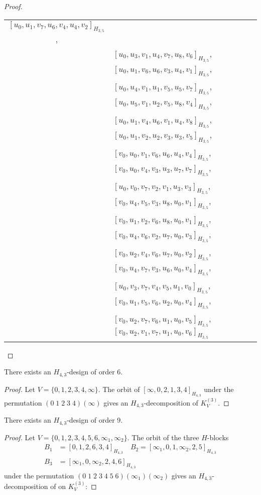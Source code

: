 \begin{subappendices}
\begin{proof}
{\begin{longtable}{|c|l|}
  $[u_0, u_1, v_7, u_6, v_4, u_4, v_2]_{H_{3,5}}$, \\* &
  $[u_0, u_3, v_1, u_4, v_7, u_8, v_6]_{H_{3,5}}$,
  $[u_0, u_1, v_6, u_6, v_3, u_4, v_1]_{H_{3,5}}$, \\* &
  $[u_0, u_4, v_1, u_1, v_5, u_5, v_7]_{H_{3,5}}$,
  $[u_0, u_5, v_1, u_2, v_5, u_8, v_4]_{H_{3,5}}$, \\* &
  $[u_0, u_1, v_4, u_6, v_1, u_4, v_8]_{H_{3,5}}$,
  $[u_0, u_1, v_2, u_2, v_3, u_3, v_5]_{H_{3,5}}$, \\* &
  $[v_0, u_0, v_1, v_6, u_6, u_4, v_4]_{H_{3,5}}$,
  $[v_0, u_0, v_4, v_3, u_3, u_7, v_7]_{H_{3,5}}$, \\* &
  $[u_0, v_0, v_7, v_2, v_1, u_3, v_3]_{H_{3,5}}$,
  $[v_0, u_4, v_5, v_3, u_8, u_0, v_1]_{H_{3,5}}$, \\* &
  $[v_0, u_1, v_2, v_6, u_8, u_0, v_1]_{H_{3,5}}$,
  $[v_0, u_4, v_6, v_2, u_7, u_0, v_3]_{H_{3,5}}$, \\* &
  $[v_0, u_2, v_4, v_6, u_7, u_0, v_2]_{H_{3,5}}$,
  $[v_0, u_4, v_7, v_3, u_6, u_0, v_4]_{H_{3,5}}$, \\* &
  $[u_0, v_3, v_7, v_4, v_5, u_1, v_0]_{H_{3,5}}$,
  $[v_0, u_1, v_5, v_6, u_2, u_0, v_4]_{H_{3,5}}$, \\* &
  $[v_0, u_2, v_7, v_6, u_1, u_0, v_5]_{H_{3,5}}$,
  $[v_0, u_2, v_1, v_7, u_1, u_0, v_6]_{H_{3,5}}$
\\ \hline
\end{longtable}
}
\end{proof}


\begin{example} \label{eg:H_43-6}
There exists an $H_{4,3}$-design of order 6.
\end{example}

\begin{proof}
Let $V = \{0,1,2,3,4,\infty\}$. The orbit of $[\infty, 0, 2, 1, 3, 4]_{H_{4,3}}$ under the permutation $(0\; 1\; 2\; 3\; 4)(\infty)$ gives an $H_{4,3}$-decomposition of $K_V^{(3)}$.
\end{proof}


\begin{example} \label{eg:H_43-9}
There exists an $H_{4,3}$-design of order 9.
\end{example}

\begin{proof}
Let $V = \{0,1,2,3,4,5,6,\infty_1,\infty_2\}$. The orbit of the three $H$-blocks
\begin{align*}
    B_1 &= [0,1,2,6,3,4]_{H_{4,3}} \quad
    B_2 = [\infty_1, 0, 1, \infty_2, 2, 5]_{H_{4,3}} \\
    B_3 &= [\infty_1, 0, \infty_2, 2, 4, 6]_{H_{4,3}}
\end{align*}
under the permutation $(0\; 1\; 2\; 3\; 4\; 5\; 6)(\infty_1)(\infty_2)$ gives an $H_{4,3}$-decomposition of on $K_V^{(3)}$:


\end{proof}
\end{subappendices}
